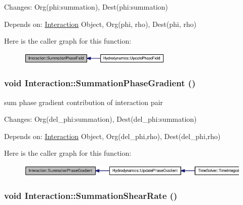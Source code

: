 Changes: Org(phi:summation), Dest(phi:summation)\par
 Depends on: \hyperlink{classInteraction}{Interaction} Object, Org(phi, rho), Dest(phi, rho) 

Here is the caller graph for this function:\nopagebreak
\begin{figure}[H]
\begin{center}
\leavevmode
\includegraphics[width=208pt]{classInteraction_6c0000b8eaede20c1d3576013195d71f_icgraph}
\end{center}
\end{figure}
\hypertarget{classInteraction_28d4a91b7bbf8a430474ff0659d61d2d}{
\subsubsection[{SummationPhaseGradient}]{\setlength{\rightskip}{0pt plus 5cm}void Interaction::SummationPhaseGradient ()}}
\label{classInteraction_28d4a91b7bbf8a430474ff0659d61d2d}


sum phase gradient contribution of interaction pair 

Changes: Org(del\_\-phi:summation), Dest(del\_\-phi:summation)\par
 Depends on: \hyperlink{classInteraction}{Interaction} Object, Org(del\_\-phi,rho), Dest(del\_\-phi,rho) 

Here is the caller graph for this function:\nopagebreak
\begin{figure}[H]
\begin{center}
\leavevmode
\includegraphics[width=367pt]{classInteraction_28d4a91b7bbf8a430474ff0659d61d2d_icgraph}
\end{center}
\end{figure}
\hypertarget{classInteraction_98a1dd36fd34e7646aec02e21426562d}{
\subsubsection[{SummationShearRate}]{\setlength{\rightskip}{0pt plus 5cm}void Interaction::SummationShearRate ()}}
\label{classInteraction_98a1dd36fd34e7646aec02e21426562d}


